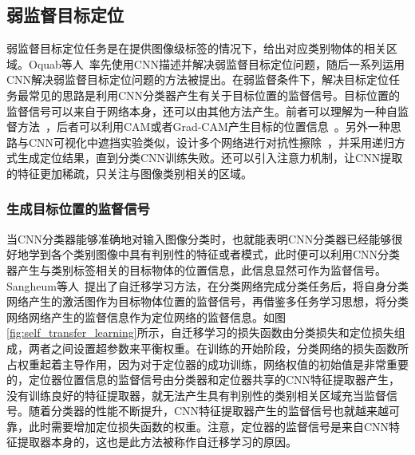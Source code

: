 \subsection{弱监督目标定位}
弱监督目标定位任务是在提供图像级标签的情况下，给出对应类别物体的相关区域。Oquab等人~\cite{Oquab2015IsOL}率先使用CNN描述并解决弱监督目标定位问题，随后一系列运用CNN解决弱监督目标定位问题的方法被提出。在弱监督条件下，解决目标定位任务最常见的思路是利用CNN分类器产生有关于目标位置的监督信号。目标位置的监督信号可以来自于网络本身，还可以由其他方法产生。前者可以理解为一种自监督方法~\cite{2015Hwang}，后者可以利用CAM或者Grad-CAM产生目标的位置信息~\cite{Kim_2017_ICCV, Krishna2018}。另外一种思路与CNN可视化中遮挡实验类似，设计多个网络进行对抗性擦除~\cite{WeiFLCZY17, ZhangWF0H18}，并采用递归方式生成定位结果，直到分类CNN训练失败。还可以引入注意力机制，让CNN提取的特征更加稀疏，只关注与图像类别相关的区域。

\subsubsection*{生成目标位置的监督信号}
当CNN分类器能够准确地对输入图像分类时，也就能表明CNN分类器已经能够很好地学到各个类别图像中具有判别性的特征或者模式，此时便可以利用CNN分类器产生与类别标签相关的目标物体的位置信息，此信息显然可作为监督信号。Sangheum等人~\cite{2015Hwang}提出了自迁移学习方法，在分类网络完成分类任务后，将自身分类网络产生的激活图作为目标物体位置的监督信号，再借鉴多任务学习思想，将分类网络网络产生的监督信息作为定位网络的监督信息。如图\ref{fig:self_transfer_learning}所示，自迁移学习的损失函数由分类损失和定位损失组成，两者之间设置超参数来平衡权重。在训练的开始阶段，分类网络的损失函数所占权重起着主导作用，因为对于定位器的成功训练，网络权值的初始值是非常重要的，定位器位置信息的监督信号由分类器和定位器共享的CNN特征提取器产生，没有训练良好的特征提取器，就无法产生具有判别性的类别相关区域充当监督信号。随着分类器的性能不断提升，CNN特征提取器产生的监督信号也就越来越可靠，此时需要增加定位损失函数的权重。注意，定位器的监督信号是来自CNN特征提取器本身的，这也是此方法被称作自迁移学习的原因。

